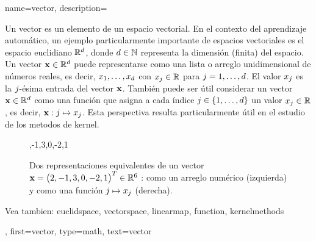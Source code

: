 {name={vector},
	description={
		Un  vector es un elemento de un espacio vectorial. 
		En el contexto del aprendizaje automático, un ejemplo particularmente importante de espacios vectoriales 
		es el espacio euclidiano $\mathbb{R}^{d}$, donde $d \in \mathbb{N}$ 
		representa la dimensión (finita) del espacio. Un vector ${\bf x} \in \mathbb{R}^{d}$ 
		puede representarse como una lista o arreglo unidimensional de números reales, es decir, 
		$x_1, \ldots, x_{d}$ con $x_j \in \mathbb{R}$ para 
		$j = 1, \ldots, d$. El valor $x_j$ es la $j$-ésima 
		entrada del vector ${\bf x}$. También puede ser útil considerar un vector ${\bf x} \in \mathbb{R}^{d}$ 
		como una función que asigna a cada índice $j \in \{1, \ldots, d\}$ 
		un valor $x_j \in \mathbb{R}$, es decir, ${\bf x}: j \mapsto x_j$. 
		Esta perspectiva resulta particularmente útil en el estudio de los metodos de kernel.
\begin{figure}[H]
\begin{minipage}[c]{0.48\textwidth}
,-1,3,0,-2,1
\end{minipage}
\hfill
\begin{minipage}{0.48\textwidth}
\centering
{}
\end{minipage}
\caption{Dos representaciones equivalentes de un vector ${\bf x}= \big( 2,-1,3,0,-2,1 \big)^{T} \in \mathbb{R}^{6}$
: como un arreglo numérico (izquierda) y como una función $j \mapsto x_j$ (derecha).}
\label{fig:vector-function-dual_dict}
\end{figure}
		Vea tambien: \gls{euclidspace}, \gls{vectorspace}, \gls{linearmap}, \gls{function}, \glspl{kernelmethod}},
	first={vector},
	type=math,
	text={vector}
}

